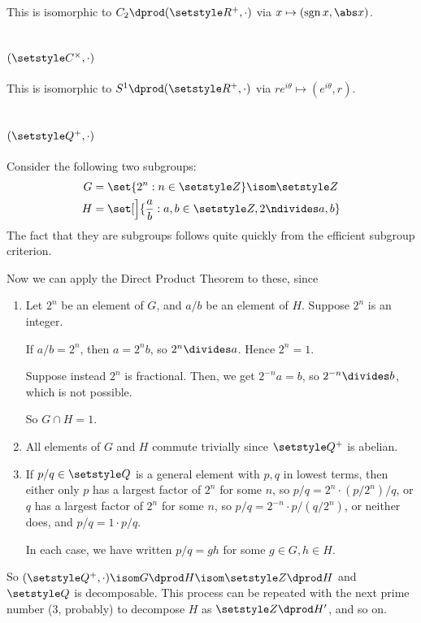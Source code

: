 \documentclass[fleqn,a4paper,11pt]{article}
\begin{document}
This is isomorphic to \(C_2 \dprod (\R^+, \cdot)\) via
\(x \mapsto (\sgn x, \abs x)\).

\section{\((\CC^\times, \cdot)\)}

This is isomorphic to \(S^1 \dprod (\R^+, \cdot)\) via
\(re^{i\theta} \mapsto (e^{i\theta}, r)\).

\section{\((\Q^+, \cdot)\)}

Consider the following two subgroups:
\begin{align*}
 G &= \set{2^n : n \in \Z} \isom \Z \\
 H &= \set[\Big]{\frac ab : a, b \in \Z, 2 \ndivides a, b}
\end{align*}
The fact that they are subgroups follows quite quickly from the efficient
subgroup criterion.

Now we can apply the Direct Product Theorem to these, since
\begin{enumerate}[label=(\roman*)]
 \item
  Let \(2^n\) be an element of \(G\), and \(a/b\) be an element of \(H\).
  Suppose \(2^n\) is an integer.

  If \(a/b = 2^n\), then \(a = 2^n b\), so \(2^n \divides a\). Hence \(2^n = 1\).

  Suppose instead \(2^n\) is fractional. Then, we get \(2^{-n} a = b\), so
  \(2^{-n} \divides b\), which is not possible.

  So \(G \cap H = {1}\).
 \item
  All elements of \(G\) and \(H\) commute trivially since \(\Q^+\) is abelian.
 \item
  If \(p/q \in \Q\) is a general element with \(p, q\) in lowest terms, then
  either only \(p\) has a largest factor of \(2^n\) for some \(n\), so
  \(p/q = 2^n \cdot (p/2^n)/q\), or \(q\) has a largest factor of \(2^n\) for
  some \(n\), so \(p/q = 2^{-n} \cdot p/(q/2^n)\), or neither does, and
  \(p/q = 1 \cdot p/q\).

  In each case, we have written \(p/q = gh\) for some \(g \in G, h \in H\).
\end{enumerate}
So \((\Q^+, \cdot) \isom G \dprod H \isom \Z \dprod H\) and \(\Q\) is
decomposable. This process can be repeated with the next prime number (\(3\),
probably) to decompose \(H\) as \(\Z \dprod H'\), and so on.
\end{document}
